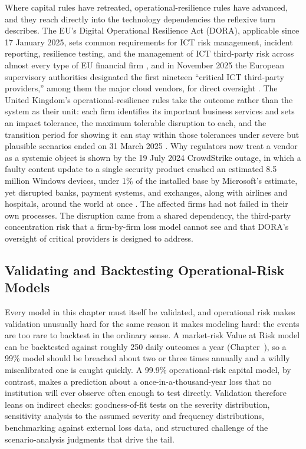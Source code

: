 \documentclass[../ai_in_finance]{subfiles}
\begin{document}
Where capital rules have retreated, operational-resilience rules have advanced, and they reach directly into the technology dependencies the reflexive turn describes. The EU's Digital Operational Resilience Act (DORA), applicable since 17 January 2025, sets common requirements for ICT risk management, incident reporting, resilience testing, and the management of ICT third-party risk across almost every type of EU financial firm \parencite{eu2022dora}, and in November 2025 the European supervisory authorities designated the first nineteen ``critical ICT third-party providers,'' among them the major cloud vendors, for direct oversight \parencite{esas2025ctpp}. The United Kingdom's operational-resilience rules take the outcome rather than the system as their unit: each firm identifies its important business services and sets an impact tolerance, the maximum tolerable disruption to each, and the transition period for showing it can stay within those tolerances under severe but plausible scenarios ended on 31 March 2025 \parencite{pra2021ss121}. Why regulators now treat a vendor as a systemic object is shown by the 19 July 2024 CrowdStrike outage, in which a faulty content update to a single security product crashed an estimated 8.5 million Windows devices, under 1\% of the installed base by Microsoft's estimate, yet disrupted banks, payment systems, and exchanges, along with airlines and hospitals, around the world at once \parencite{microsoft2024crowdstrike}. The affected firms had not failed in their own processes. The disruption came from a shared dependency, the third-party concentration risk that a firm-by-firm loss model cannot see and that DORA's oversight of critical providers is designed to address.

\subsection{Validating and Backtesting Operational-Risk Models}
\label{sec:oprisk-validation}

Every model in this chapter must itself be validated, and operational risk makes validation unusually hard for the same reason it makes modeling hard: the events are too rare to backtest in the ordinary sense. A market-risk Value at Risk model can be backtested against roughly 250 daily outcomes a year (Chapter~), so a 99\% model should be breached about two or three times annually and a wildly miscalibrated one is caught quickly. A 99.9\% operational-risk capital model, by contrast, makes a prediction about a once-in-a-thousand-year loss that no institution will ever observe often enough to test directly. Validation therefore leans on indirect checks: goodness-of-fit tests on the severity distribution, sensitivity analysis to the assumed severity and frequency distributions, benchmarking against external loss data, and structured challenge of the scenario-analysis judgments that drive the tail.
\end{document}
